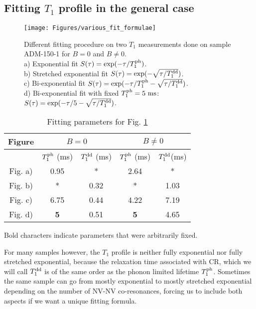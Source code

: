 \documentclass[a4paper,11pt]{report}
\begin{document}
\subsection{Fitting $T_1$ profile in the general case}

\begin{figure}[h]
\centering
\texttt{[image: Figures/various\_fit\_formulae]}
\caption{Different fitting procedure on two $T_1$ measurements done on sample ADM-150-1 for $B=0$ and $B\neq0$. \\ a) Exponential fit $S(\tau)=\exp (-\tau/T_1^{\rm ph})$. \\ b) Stretched exponential fit $S(\tau)=\exp (-\sqrt{\tau/T_1^{\rm dd}})$. \\ c) Bi-exponential fit $S(\tau)=\exp (-\tau/T_1^{\rm ph} -\sqrt{\tau/T_1^{\rm dd}})$. \\ d) Bi-exponential fit with fixed $T_1^{\rm ph}=5\ \rm ms$: $S(\tau)=\exp (-\tau/5 -\sqrt{\tau/T_1^{\rm dd}})$.}
\label{various_fit_formulae}
\end{figure}

\begin{table}[htbp]
\centering
\caption{Fitting parameters for Fig.
 \ref{various_fit_formulae}}
 \label{fitting table}
\begin{tabular}{c|cc|cc}
\toprule
Figure &  \multicolumn{2}{c}{$B=0$} & \multicolumn{2}{c}{$B\neq0$}\\
\midrule
{} &  $T_1^{\rm ph}$ (ms)& $T_1^{\rm dd}$ (ms)&  $T_1^{\rm ph}$ (ms)& $T_1^{\rm dd}$(ms)\\
Fig. a) & 0.95 & * & 2.64 & * \\
Fig. b) & * & 0.32 & * & 1.03  \\
Fig. c) & 6.75 & 0.44 & 4.22 & 7.19 \\
Fig. d) & \textbf{5} & 0.51 & \textbf{5} & 4.65 \\
\bottomrule
\end{tabular}

Bold characters indicate parameters that were arbitrarily fixed.
\end{table}

For many samples however, the $T_1$ profile is neither fully exponential nor fully stretched exponential, because the relaxation time associated with CR, which we will call $T_1^{\rm dd}$ is of the same order as the phonon limited lifetime $T_1^{\rm ph}$. Sometimes the same sample can go from mostly exponential to mostly stretched exponential depending on the number of NV-NV co-resonances, forcing us to include both aspects if we want a unique fitting formula.
\end{document}
